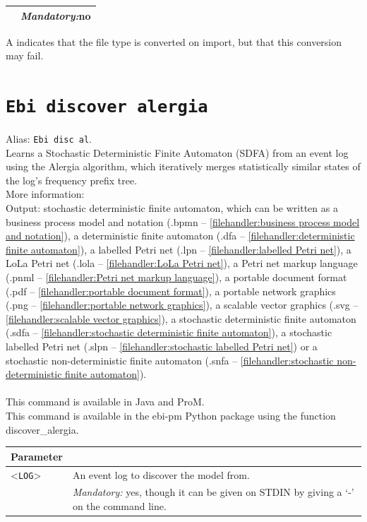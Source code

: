{\begin{tabularx}{\linewidth}{lX}
&\textit{Mandatory:}\quad no\\
\bottomrule
\end{tabularx}
A \textdagger{} indicates that the file type is converted on import, but that this conversion may fail.
\clearpage\section{\texttt{Ebi discover alergia}}
\label{command:Ebi discover alergia}
Alias: \texttt{Ebi disc al}.\\
Learns a Stochastic Deterministic Finite Automaton (SDFA) from an event log using the Alergia algorithm, which iteratively merges statistically similar states of the log's frequency prefix tree.\\
More information: ~\cite{DBLP:conf/icgi/CarrascoO94}~\\
\noindent Output: stochastic deterministic finite automaton, which can be written as a business process model and notation (.bpmn -- \cref{filehandler:business process model and notation}), a deterministic finite automaton (.dfa -- \cref{filehandler:deterministic finite automaton}), a labelled Petri net (.lpn -- \cref{filehandler:labelled Petri net}), a LoLa Petri net (.lola -- \cref{filehandler:LoLa Petri net}), a Petri net markup language (.pnml -- \cref{filehandler:Petri net markup language}), a portable document format (.pdf -- \cref{filehandler:portable document format}), a portable network graphics (.png -- \cref{filehandler:portable network graphics}), a scalable vector graphics (.svg -- \cref{filehandler:scalable vector graphics}), a stochastic deterministic finite automaton (.sdfa -- \cref{filehandler:stochastic deterministic finite automaton}), a stochastic labelled Petri net (.slpn -- \cref{filehandler:stochastic labelled Petri net}) or a stochastic non-deterministic finite automaton (.snfa -- \cref{filehandler:stochastic non-deterministic finite automaton}).\\
\\This command is available in Java and ProM.
\\This command is available in the ebi-pm Python package using the function discover\_alergia.
\begin{tabularx}{\linewidth}{lX}
\toprule
Parameter \\\midrule
<\texttt{LOG}>&An event log to discover the model from.\\
&\textit{Mandatory:} \quad yes, though it can be given on STDIN by giving a `-' on the command line.\\

\end{tabularx}}
